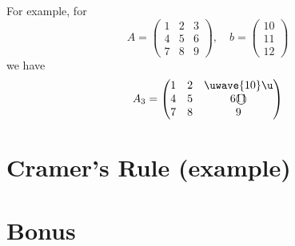\documentclass[8pt]{article} %
\begin{document}
For example, for \[A=\begin{pmatrix}1&2&3\\4&5&6\\7&8&9\end{pmatrix},\quad b=\begin{pmatrix}10\\11\\12\end{pmatrix}\]
we have
\[A_3=\begin{pmatrix}1&2&\uwave{10}\u\\4&5&6\mbox{\textcircled{11}}\\7&8&9\end{pmatrix}\]

\section{Cramer's Rule (example)}
\section{Bonus}
\end{document}
